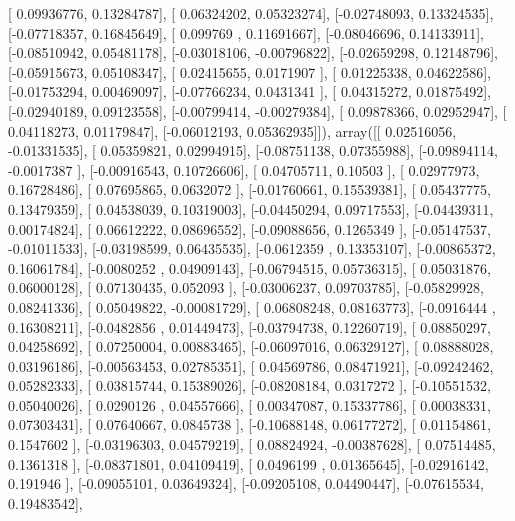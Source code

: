 \documentclass{article}
\begin{document}
       [ 0.09936776,  0.13284787],
       [ 0.06324202,  0.05323274],
       [-0.02748093,  0.13324535],
       [-0.07718357,  0.16845649],
       [ 0.099769  ,  0.11691667],
       [-0.08046696,  0.14133911],
       [-0.08510942,  0.05481178],
       [-0.03018106, -0.00796822],
       [-0.02659298,  0.12148796],
       [-0.05915673,  0.05108347],
       [ 0.02415655,  0.0171907 ],
       [ 0.01225338,  0.04622586],
       [-0.01753294,  0.00469097],
       [-0.07766234,  0.0431341 ],
       [ 0.04315272,  0.01875492],
       [-0.02940189,  0.09123558],
       [-0.00799414, -0.00279384],
       [ 0.09878366,  0.02952947],
       [ 0.04118273,  0.01179847],
       [-0.06012193,  0.05362935]]), array([[ 0.02516056, -0.01331535],
       [ 0.05359821,  0.02994915],
       [-0.08751138,  0.07355988],
       [-0.09894114, -0.0017387 ],
       [-0.00916543,  0.10726606],
       [ 0.04705711,  0.10503   ],
       [ 0.02977973,  0.16728486],
       [ 0.07695865,  0.0632072 ],
       [-0.01760661,  0.15539381],
       [ 0.05437775,  0.13479359],
       [ 0.04538039,  0.10319003],
       [-0.04450294,  0.09717553],
       [-0.04439311,  0.00174824],
       [ 0.06612222,  0.08696552],
       [-0.09088656,  0.1265349 ],
       [-0.05147537, -0.01011533],
       [-0.03198599,  0.06435535],
       [-0.0612359 ,  0.13353107],
       [-0.00865372,  0.16061784],
       [-0.0080252 ,  0.04909143],
       [-0.06794515,  0.05736315],
       [ 0.05031876,  0.06000128],
       [ 0.07130435,  0.052093  ],
       [-0.03006237,  0.09703785],
       [-0.05829928,  0.08241336],
       [ 0.05049822, -0.00081729],
       [ 0.06808248,  0.08163773],
       [-0.0916444 ,  0.16308211],
       [-0.0482856 ,  0.01449473],
       [-0.03794738,  0.12260719],
       [ 0.08850297,  0.04258692],
       [ 0.07250004,  0.00883465],
       [-0.06097016,  0.06329127],
       [ 0.08888028,  0.03196186],
       [-0.00563453,  0.02785351],
       [ 0.04569786,  0.08471921],
       [-0.09242462,  0.05282333],
       [ 0.03815744,  0.15389026],
       [-0.08208184,  0.0317272 ],
       [-0.10551532,  0.05040026],
       [ 0.0290126 ,  0.04557666],
       [ 0.00347087,  0.15337786],
       [ 0.00038331,  0.07303431],
       [ 0.07640667,  0.0845738 ],
       [-0.10688148,  0.06177272],
       [ 0.01154861,  0.1547602 ],
       [-0.03196303,  0.04579219],
       [ 0.08824924, -0.00387628],
       [ 0.07514485,  0.1361318 ],
       [-0.08371801,  0.04109419],
       [ 0.0496199 ,  0.01365645],
       [-0.02916142,  0.191946  ],
       [-0.09055101,  0.03649324],
       [-0.09205108,  0.04490447],
       [-0.07615534,  0.19483542],
\end{document}
